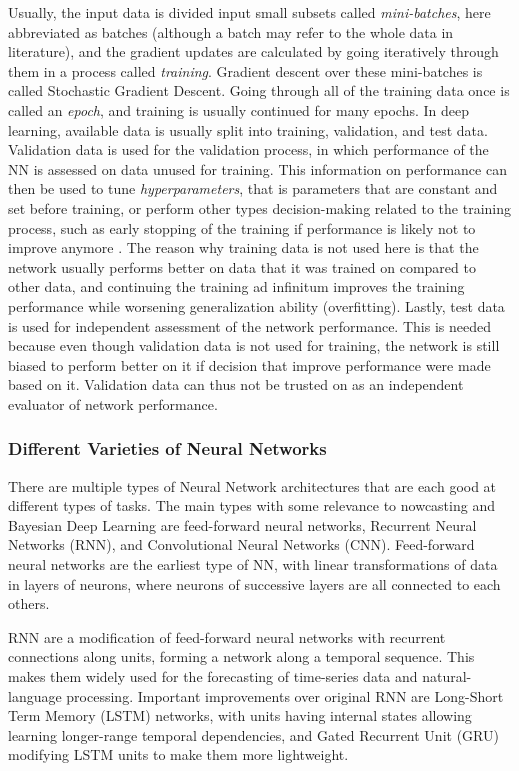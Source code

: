 Usually, the input data is divided input small subsets called \textit{mini-batches}, here abbreviated as batches (although a batch may refer to the whole data in literature), and the gradient updates are calculated by going iteratively through them in a process called \textit{training}. Gradient descent over these mini-batches is called Stochastic Gradient Descent. Going through all of the training data once is called an \textit{epoch}, and training is usually continued for many epochs. In deep learning, available data is usually split into training, validation, and test data. Validation data is used for the validation process, in which performance of the NN is assessed on data unused for training. This information on performance can then be used to tune \textit{hyperparameters}, that is parameters that are constant and set before training, or perform other types decision-making related to the training process, such as early stopping of the training if performance is likely not to improve anymore \cite{prechelt1998early}. The reason why training data is not used here is that the network usually performs better on data that it was trained on compared to other data, and continuing the training ad infinitum improves the training performance while worsening generalization ability (overfitting). Lastly, test data is used for independent assessment of the network performance. This is needed because even though validation data is not used for training, the network is still biased to perform better on it if decision that improve performance were made based on it. Validation data can thus not be trusted on as an independent evaluator of network performance. 

\subsubsection*{Different Varieties of Neural Networks}
There are multiple types of Neural Network architectures that are each good at different types of tasks. The main types with some relevance to nowcasting and Bayesian Deep Learning are feed-forward neural networks, Recurrent Neural Networks (RNN), and Convolutional Neural Networks (CNN). Feed-forward neural networks are the earliest type of NN, with linear transformations of data in layers of neurons, where neurons of successive layers are all connected to each others.

 RNN are a modification of feed-forward neural networks with recurrent connections along units, forming a network along a temporal sequence. This makes them widely used for the forecasting of time-series data and natural-language processing. Important improvements over original RNN are Long-Short Term Memory (LSTM) networks, with units having internal states allowing learning longer-range temporal dependencies, and Gated Recurrent Unit (GRU) modifying LSTM units to make them more lightweight. 

